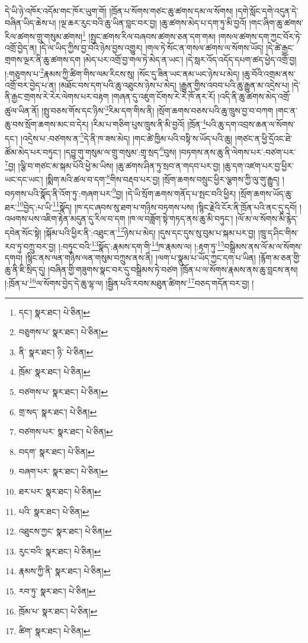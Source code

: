 དེ་ཡི་ཉེ་འཁོར་འདོམ་གང་ཁོར་ཡུག་གོ། །ཁྲོན་པ་སོགས་གཙང་ཆུ་ཚགས་དམ་ལ་སོགས། །དགེ་སློང་དགེ་འདུན་དེ་བཞིན་ཡིད་ཆེས་པ། །ལྔ་ཆར་རུང་བའི་ཆུ་ཡིན་བླང་བར་བྱ། །ཆུ་ཚགས་མེད་པ་དག་ཏུ་མི་བྱའོ། །གང་ཞིག་ཆུ་ཚགས་རིལ་ཚགས་གྲུ་གསུམ་ཚགས།\footnote{དང་།  སྣར་ཐང་།  པེ་ཅིན། } །སྤྱང་ཚགས་རིལ་བཞབས་ཚགས་ཅན་དག་གམ། །གསལ་ཚགས་དག་ཀྱང་བོར་ཏེ་འགྲོ་བྱེད་ན། །དེ་ལ་ཡིད་ཀྱིས་བྱ་བའི་ཉེས་བྱས་འགྱུར། །གལ་ཏེ་སོང་ན་གསལ་ཚགས་ལ་སོགས་ཡོད། །དེ་ཚེ་རྒྱང་གྲགས་ལྔར་ནི་ཆུ་ཚགས་དག །མེད་པར་འགྲོ་བྱ་གལ་ཏེ་མེད་ན་ཡང་། །དེ་སླར་འོད་འདོད་དཔག་ཚད་ཕྱེད་འགྲོ་བྱ། །:གཅུགས་པ་\footnote{བཅུགས་པ་  སྣར་ཐང་།  པེ་ཅིན། }རྣམས་ཀྱི་ཚིག་གིས་ལམ་རིངས་སུ། །སོང་དུ་ཟིན་ཡང་ནམ་ཡང་ཉེས་པ་མེད། །ཆུ་བོའི་འགྲམ་ནས་འགྲོ་བར་བྱེད་པ་ན། །མཐོང་བས་དག་པའི་ཆུ་འཐུངས་ཉེས་པ་མེད། །རྒྱུན་གྱིས་འབབ་པའི་ཆུ་རྒྱུན་མ་འདྲེས་པ། །དེ་ནི་རྒྱང་གྲགས་རེ་རེར་ལེགས་པར་བརྟག །གཞན་དུ་འཇུག་ངོགས་རེ་རེ་ཁོ་ནར་རོ། །འདི་ནི་ཆུ་ཚགས་མེད་འགྲོ་ཚུལ་ཡིན་ནོ། །སྤུ་བཅས་གོས་དང་ཉིས་\footnote{ནི་  སྣར་ཐང་། ཉི་  པེ་ཅིན། }རིམ་དག་གིས་ནི། །སྲོག་ཆགས་བཅས་པའི་ཆུ་ཁྲུས་བྱ་བ་བཀག །གང་ན་ཆུ་བས་སྲོག་ཆགས་མང་བ་དེར། །རིམ་པ་གཅིག་པུས་ཁྲུས་ནི་མི་བྱའོ། །ཁྲོན་\footnote{ཁྲོམ་  སྣར་ཐང་།  པེ་ཅིན། }པའི་ཆུ་དག་འབྲས་ཆན་ལ་སོགས་དང་། །འདྲེས་པ་:བཙགས་ན་\footnote{བཙགས་པ་  སྣར་ཐང་།  པེ་ཅིན། }དེ་ནི་ཁ་ཟས་མེད། །གང་ཚེ་ཁྱིམ་པའི་བསྟི་ས་ཡོད་པའི་ཆུ། །གཙང་ན་ཕྱི་དྲོའང་ཐེ་ཚོམ་མེད་པར་བཏུང་། །དབྱུ་གུ་གསུམ་ལ་གྲུ་གསུམ་:གྲྭ་སྲད་\footnote{གྲ་སད་  སྣར་ཐང་།  པེ་ཅིན། }བུས། །བཏགས་ནས་ཆུ་ནི་ལེགས་པར་:བཙག་པར་\footnote{བཙགས་པར་  སྣར་ཐང་།  པེ་ཅིན། }བྱ། །ལྕི་བ་གཙང་མ་སྐམ་པོའི་ཕྱེ་མ་ཡིས། །ཆུ་ཚགས་ཤིན་ཏུ་སྲབ་ན་གདབ་པར་བྱ། །ཆུ་དག་འཛག་པར་བྱ་ཕྱིར་ཡང་དང་ཡང་། །སྨིག་མའི་ཚལ་བ་དག་\footnote{བདག་  སྣར་ཐང་།  པེ་ཅིན། }གིས་བརྡབ་པར་བྱ། །སྲོག་ཆགས་བསྲུང་ཕྱིར་ལྕགས་ཀྱི་ལུ་གུ་རྒྱུད། །བཏགས་པའི་སྣོད་ནི་འོག་ཏུ་:གཞག་པར་\footnote{བཞག་པར་  སྣར་ཐང་།  པེ་ཅིན། }བྱ། །དེ་ཡི་སྲོག་ཆགས་གནོད་པ་སྤང་བའི་ཕྱིར། །སྲོག་ཆགས་ཡོད་ཆུ་ཐར་\footnote{ཐར་པར་  སྣར་ཐང་།  པེ་ཅིན། }བྱེད་:པ་ཡི་\footnote{པའི་  སྣར་ཐང་།  པེ་ཅིན། }སྣོད། །ཁ་དང་ཞབས་སུ་ཐག་པ་གཉིས་བཏགས་པས། །སྙིང་རྗེའི་ངོར་ནི་ཁྲོན་པའི་ནང་དུ་དབོ། །འཕགས་པས་འཇིག་རྟེན་མདུན་དུ་རིལ་བ་དག །ཁ་ལ་བཟློག་སྟེ་གཏད་ནས་ཆུ་མི་བཏུང་། །ལོ་མ་ལ་སོགས་མི་རྙེད་དབེན་སོང་སྟེ། །སྐོམ་པའི་ཕྱིར་ནི་:འཐུང་ན་\footnote{འཐུངས་ཀྱང་  སྣར་ཐང་།  པེ་ཅིན། }ཉེས་པ་མེད། །དུས་དང་དུས་སུ་བུམ་པ་སྐམ་པར་བྱ། །ཁྲུ་ད་ཤིང་གིས་རབ་ཏུ་བཀྲུ་བར་བྱ། །:བཏུང་བའི་\footnote{རུང་བའི་  སྣར་ཐང་།  པེ་ཅིན། }སྣོད་:རྣམས་དག་གི་\footnote{རྣམས་ཀྱི་ནི་  སྣར་ཐང་།  པེ་ཅིན། }ཁ་རྣམས་ལ། །:རྟག་ཏུ་\footnote{རབ་ཏུ་  སྣར་ཐང་།  པེ་ཅིན། }བསྒྲིམས་ནས་ལོ་མ་ལ་སོགས་དགབ། །སྙིང་ནས་ལན་གཉིས་ལན་གསུམ་བཀྲུས་ནས་ནི། །ལག་པ་སྣུམ་པ་ཡོད་ཀྱང་དག་པ་ཡིན། །རྙོག་མ་ཅན་གྱི་ཆུ་ནི་ཇི་སྲིད་དུ། །བཞིན་གྱི་གཟུགས་སྣང་བར་དུ་བསྒྲིམས་ཏེ་བཙག །ཁྲོན་པ་ལ་སོགས་རྣམས་ནས་ཆུ་བླངས་ནས། །:ཁྲོན་པ་\footnote{ཁྲོམ་པ་  སྣར་ཐང་།  པེ་ཅིན། }ལ་སོགས་བྱེད་དེ་ཆུ་ལྷ་ལ། །སྦྱིན་པའི་རབས་མཐུན་ཚིགས་\footnote{ཚིག་  སྣར་ཐང་།  པེ་ཅིན། }བཅད་གདོན་བར་བྱ། །
